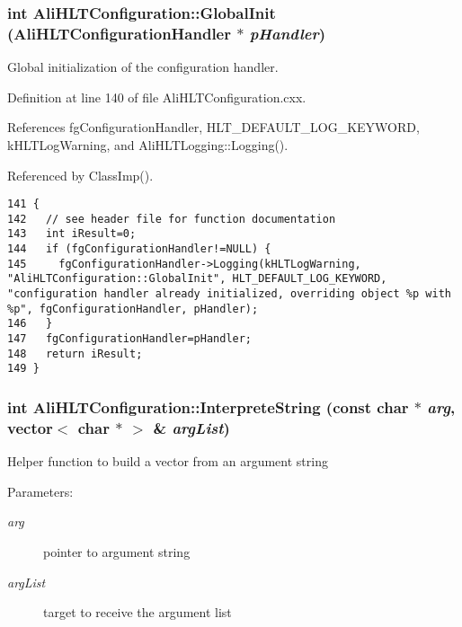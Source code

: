 \subsubsection{\setlength{\rightskip}{0pt plus 5cm}int Ali\-HLTConfiguration::Global\-Init ({\bf Ali\-HLTConfiguration\-Handler} $\ast$ {\em p\-Handler})\hspace{0.3cm}{\tt  [static]}}\label{classAliHLTConfiguration_e0}


Global initialization of the configuration handler. 

Definition at line 140 of file Ali\-HLTConfiguration.cxx.

References fg\-Configuration\-Handler, HLT\_\-DEFAULT\_\-LOG\_\-KEYWORD, k\-HLTLog\-Warning, and Ali\-HLTLogging::Logging().

Referenced by Class\-Imp().

\footnotesize\begin{verbatim}141 {
142   // see header file for function documentation
143   int iResult=0;
144   if (fgConfigurationHandler!=NULL) {
145     fgConfigurationHandler->Logging(kHLTLogWarning, "AliHLTConfiguration::GlobalInit", HLT_DEFAULT_LOG_KEYWORD, "configuration handler already initialized, overriding object %p with %p", fgConfigurationHandler, pHandler);
146   }
147   fgConfigurationHandler=pHandler;
148   return iResult;
149 }
\end{verbatim}\normalsize 


\subsubsection{\setlength{\rightskip}{0pt plus 5cm}int Ali\-HLTConfiguration::Interprete\-String (const char $\ast$ {\em arg}, vector$<$ char $\ast$ $>$ \& {\em arg\-List})\hspace{0.3cm}{\tt  [private]}}\label{classAliHLTConfiguration_d2}


Helper function to build a vector from an argument string \begin{Desc}
\item[Parameters:]
\begin{description}
\item[{\em arg}]pointer to argument string \item[{\em arg\-List}]target to receive the argument list \end{description}
\end{Desc}


